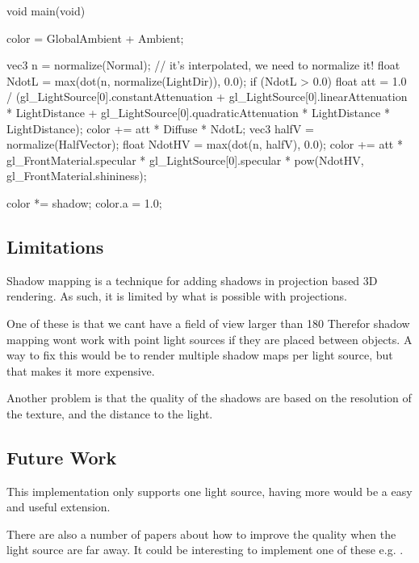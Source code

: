 \begin{cppcode}
void main(void) {
    color = GlobalAmbient + Ambient;
    
    vec3 n = normalize(Normal); // it's interpolated, we need to normalize it!
    float NdotL = max(dot(n, normalize(LightDir)), 0.0);
    if (NdotL > 0.0) {
        float att = 1.0 / 
        (gl_LightSource[0].constantAttenuation +
        gl_LightSource[0].linearAttenuation * LightDistance + 
        gl_LightSource[0].quadraticAttenuation * LightDistance * LightDistance);
        color += att * Diffuse * NdotL;
        vec3 halfV = normalize(HalfVector);
        float NdotHV = max(dot(n, halfV), 0.0);
        color += att * gl_FrontMaterial.specular 
        * gl_LightSource[0].specular
        * pow(NdotHV, gl_FrontMaterial.shininess);
    }

    color *= shadow;
    color.a = 1.0;

}
\end{cppcode}

\subsection{Limitations}

Shadow mapping is a technique for adding shadows in projection based
3D rendering. As such, it is limited by what is possible with
projections.

One of these is that we cant have a field of view larger than 180
Therefor shadow mapping wont work with point light sources if they are
placed between objects. A way to fix this would be to render multiple
shadow maps per light source, but that makes it more expensive.

Another problem is that the quality of the shadows are based on the
resolution of the texture, and the distance to the light.

\subsection{Future Work}

This implementation only supports one light source, having more would
be a easy and useful extension.

There are also a number of papers about how to improve the quality
when the light source are far away. It could be interesting to
implement one of these e.g. \citep{casc}.

